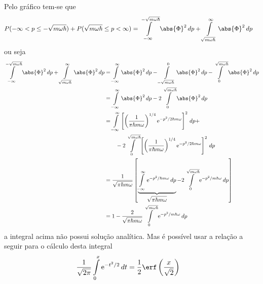 \begin{prob}
\begin{sol}
				Pelo gráfico tem-se que
				\begin{align}
					P(-\infty<p\leq -\sqrt{m \omega \hbar})+P(\sqrt{m \omega \hbar}\leq p<\infty) &= \int\limits_{-\infty}^{-\sqrt{m \omega \hbar}}\abs{\Phi}^{2}\,d{p}+\int\limits_{\sqrt{m \omega \hbar}}^{\infty}\abs{\Phi}^{2}\,d{p}
				\end{align}
				ou seja
				\begin{align}
					\begin{split}
						\int\limits_{-\infty}^{-\sqrt{ m\omega \hbar}}\abs{\Phi}^{2}\,d{p}+\int\limits_{\sqrt{m \omega \hbar}}^{\infty}\abs{\Phi}^{2}\,d{p} &= \int\limits_{-\infty}^{\infty}\abs{\Phi}^{2}\,d{p} - \int\limits_{-\sqrt{m \omega \hbar}}^{0}\abs{\Phi}^{2}\,d{p}-\int\limits_{0}^{\sqrt{m \omega \hbar}}\abs{\Phi}^{2}\,d{p}\\
																																																																								&= \int\limits_{-\infty}^{\infty}\abs{\Phi}^{2}\,d{p}-2\int\limits_{0}^{\sqrt{m \omega \hbar}}\abs{\Phi}^{2}\,d{p}\\
																																																																								&= \int\limits_{-\infty}^{\infty}\left[\left(\frac{1}{\pi \hbar m \omega}\right)^{1/4}\mathrm{e}^{-p^{2}/2\hbar m \omega}\right]^{2}\,d{p}+\\
																																																																								&\qquad -2\int\limits_{0}^{\sqrt{m \omega \hbar}}\left[\left(\frac{1}{\pi \hbar m \omega}\right)^{1/4}\mathrm{e}^{-p^{2}/2\hbar m \omega}\right]^{2}\,d{p}\\
																																																																								&= \frac{1}{\sqrt{\pi \hbar m \omega}}\left[\underbrace{\int\limits_{-\infty}^{\infty}\mathrm{e}^{-p^{2}/\hbar m \omega}\,d{p}}_{\displaystyle\sqrt{\pi \hbar m \omega}}-2\int\limits_{0}^{\sqrt{m \omega \hbar}}\mathrm{e}^{-p^{2}/m \hbar \omega}\,d{p}\right]\\
																																																																								&= 1-\frac{2}{\sqrt{\pi \hbar m \omega}}\int\limits_{0}^{\sqrt{m \omega \hbar}}\mathrm{e}^{-p^{2}/m \hbar \omega}\,d{p}
					\end{split}
				\end{align}
				a integral acima não possui solução analítica. Mas é possível usar a relação a seguir para o cálculo desta integral
				\begin{align}
					\frac{1}{\sqrt{2 \pi}}\int\limits_{0}^{x}\mathrm{e}^{-t^{2}/2}\,d{t} &= \frac{1}{2}\erf \left(\frac{x}{\sqrt{2}}\right) \label{eq:normal-erfunction}

\end{align}
\end{sol}
\end{prob}
